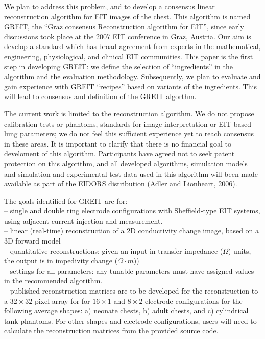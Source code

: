 \documentclass[letterpaper,twocolumn,11pt]{article}
\begin{document}
We plan to address this problem, and to develop a
consensus linear reconstruction algorithm for EIT
images of the chest.
This algorithm is named GREIT, 
the ``Graz consensus Reconstruction algorithm for EIT'',
since early discussions took place at the 2007 EIT conference
in Graz, Austria. Our aim is develop a standard which
has broad agreement from experts in the mathematical,
engineering, physiological, and clinical EIT communities.
This paper is the first step in developing GREIT:
we define the selection of ``ingredients'' in the
algorithm and the evaluation 
methodology. Subsequently, we plan to evaluate
and gain experience with GREIT ``recipes'' based on 
variants of the ingredients. This will lead to 
consensus and definition of the GREIT algorthm.

The current work is limited to the reconstruction algorithm.
We do not propose calibration tests or phantoms, standards
for image interpretation or EIT based lung parameters; 
we do not feel this sufficient experience yet to reach
consensus in these areas.
It is important to clarify that there is no financial
goal to develoment of this algorithm. Participants have
agreed not to seek patent protection on this algorithm,
and all developed algorithms, simulation
models and simulation and experimental test data used
in this algorithm will been made available as part of
the EIDORS distribution (Adler and Lionheart, 2006).

The goals identified for GREIT are for:
\\ \noindent -- 
 single and double ring electrode
configurations with Sheffield-type EIT systems, using
      adjacent current injection and measurement.
\\ \noindent -- 
 linear (real-time) reconstruction of a 2D conductivity
change image, based on a 3D forward model
\\ \noindent -- 
 quantitative reconstructions:
   given an input in transfer impedance ($\Omega$) units,
                    the output is in impedivity change ($\Omega\cdot m$))
\\ \noindent -- 
 settings for all parameters:
     any tunable parameters must have assigned
     values in the recommended algorithm.
\\ \noindent -- 
 published reconstruction matrices are to be developed for the
      reconstruction to a $32\times 32$ pixel array for
      for $16\times1$ and $8\times 2$
      electrode configurations for the following average shapes:
   a) neonate chests, 
   b) adult chests, and 
   c) cylindrical tank phantoms.
 For other shapes and electrode configurations, users will need
   to calculate the reconstruction matrices from the 
   provided source code.
\end{document}
